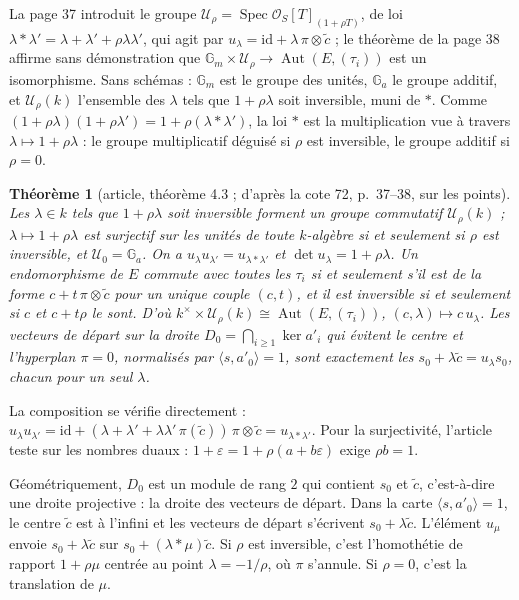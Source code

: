 \documentclass[11pt,a4paper]{amsart}
\theoremstyle{definition}
\theoremstyle{plain}
\newtheorem{theoreme}{Théorème}
\theoremstyle{remark}
\newcommand{\id}{\mathrm{id}}
\begin{document}
La page 37 introduit le groupe $\mathcal U_\rho = \operatorname{Spec}\mathcal O_S[T]_{(1+\rho T)}$, de loi $\lambda * \lambda' = \lambda + \lambda' + \rho\lambda\lambda'$, qui agit par $u_\lambda = \id + \lambda\,\pi\otimes\tilde c$ ; le théorème de la page 38 affirme sans démonstration que $\mathbb G_m \times \mathcal U_\rho \to \operatorname{Aut}(E, (\tau_i))$ est un isomorphisme. Sans schémas : $\mathbb G_m$ est le groupe des unités, $\mathbb G_a$ le groupe additif, et $\mathcal U_\rho(k)$ l'ensemble des $\lambda$ tels que $1 + \rho\lambda$ soit inversible, muni de $*$. Comme $(1 + \rho\lambda)(1 + \rho\lambda') = 1 + \rho(\lambda * \lambda')$, la loi $*$ est la multiplication vue à travers $\lambda \mapsto 1 + \rho\lambda$ : le groupe multiplicatif déguisé si $\rho$ est inversible, le groupe additif si $\rho = 0$.

\begin{theoreme}[article, théorème 4.3 ; d'après la cote 72, p.~37--38, sur les points]
Les $\lambda \in k$ tels que $1 + \rho\lambda$ soit inversible forment un groupe commutatif $\mathcal U_\rho(k)$ ; $\lambda \mapsto 1 + \rho\lambda$ est surjectif sur les unités de toute $k$-algèbre si et seulement si $\rho$ est inversible, et $\mathcal U_0 = \mathbb G_a$. On a $u_\lambda u_{\lambda'} = u_{\lambda*\lambda'}$ et $\det u_\lambda = 1 + \rho\lambda$. Un endomorphisme de $E$ commute avec toutes les $\tau_i$ si et seulement s'il est de la forme $c + t\,\pi\otimes\tilde c$ pour un unique couple $(c, t)$, et il est inversible si et seulement si $c$ et $c + t\rho$ le sont. D'où $k^\times \times \mathcal U_\rho(k) \cong \operatorname{Aut}(E, (\tau_i))$, $(c, \lambda) \mapsto c\,u_\lambda$. Les vecteurs de départ sur la droite $D_0 = \bigcap_{i \ge 1}\ker a'_i$ qui évitent le centre et l'hyperplan $\pi = 0$, normalisés par $\langle s, a'_0\rangle = 1$, sont exactement les $s_0 + \lambda\tilde c = u_\lambda s_0$, chacun pour un seul $\lambda$.
\end{theoreme}

La composition se vérifie directement : $u_\lambda u_{\lambda'} = \id + (\lambda + \lambda' + \lambda\lambda'\,\pi(\tilde c))\,\pi\otimes\tilde c = u_{\lambda*\lambda'}$. Pour la surjectivité, l'article teste sur les nombres duaux : $1 + \varepsilon = 1 + \rho(a + b\varepsilon)$ exige $\rho b = 1$.

Géométriquement, $D_0$ est un module de rang $2$ qui contient $s_0$ et $\tilde c$, c'est-à-dire une droite projective : la droite des vecteurs de départ. Dans la carte $\langle s, a'_0\rangle = 1$, le centre $\tilde c$ est à l'infini et les vecteurs de départ s'écrivent $s_0 + \lambda\tilde c$. L'élément $u_\mu$ envoie $s_0 + \lambda\tilde c$ sur $s_0 + (\lambda * \mu)\tilde c$. Si $\rho$ est inversible, c'est l'homothétie de rapport $1 + \rho\mu$ centrée au point $\lambda = -1/\rho$, où $\pi$ s'annule. Si $\rho = 0$, c'est la translation de $\mu$.
\end{document}
